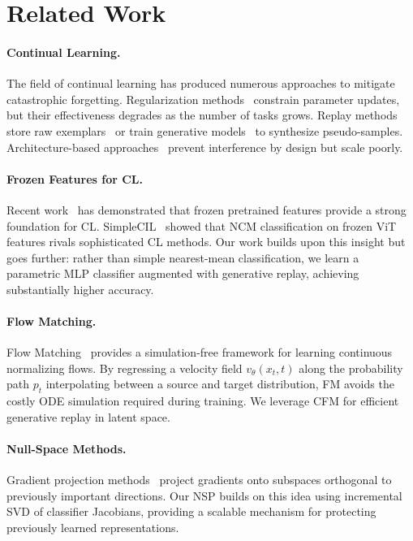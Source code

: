 \documentclass[10pt,twocolumn,letterpaper]{article}
\begin{document}
\section{Related Work}
\label{sec:related}

\paragraph{Continual Learning.}
The field of continual learning has produced numerous approaches to mitigate catastrophic forgetting. Regularization methods~\cite{kirkpatrick2017overcoming,zenke2017continual,li2017learning} constrain parameter updates, but their effectiveness degrades as the number of tasks grows. Replay methods store raw exemplars~\cite{rebuffi2017icarl,buzzega2020dark,chaudhry2019tiny} or train generative models~\cite{shin2017continual,van2020brain} to synthesize pseudo-samples. Architecture-based approaches~\cite{rusu2016progressive,mallya2018packnet} prevent interference by design but scale poorly.

\paragraph{Frozen Features for CL.}
Recent work~\cite{zhou2024revisiting,janson2022simple} has demonstrated that frozen pretrained features provide a strong foundation for CL. SimpleCIL~\cite{zhou2024revisiting} showed that NCM classification on frozen ViT features rivals sophisticated CL methods. Our work builds upon this insight but goes further: rather than simple nearest-mean classification, we learn a parametric MLP classifier augmented with generative replay, achieving substantially higher accuracy.

\paragraph{Flow Matching.}
Flow Matching~\cite{lipman2023flow,liu2022flow} provides a simulation-free framework for learning continuous normalizing flows. By regressing a velocity field $v_\theta(x_t, t)$ along the probability path $p_t$ interpolating between a source and target distribution, FM avoids the costly ODE simulation required during training. We leverage CFM for efficient generative replay in latent space.

\paragraph{Null-Space Methods.}
Gradient projection methods~\cite{zeng2019continual,saha2021gradient} project gradients onto subspaces orthogonal to previously important directions. Our NSP builds on this idea using incremental SVD of classifier Jacobians, providing a scalable mechanism for protecting previously learned representations.
\end{document}
